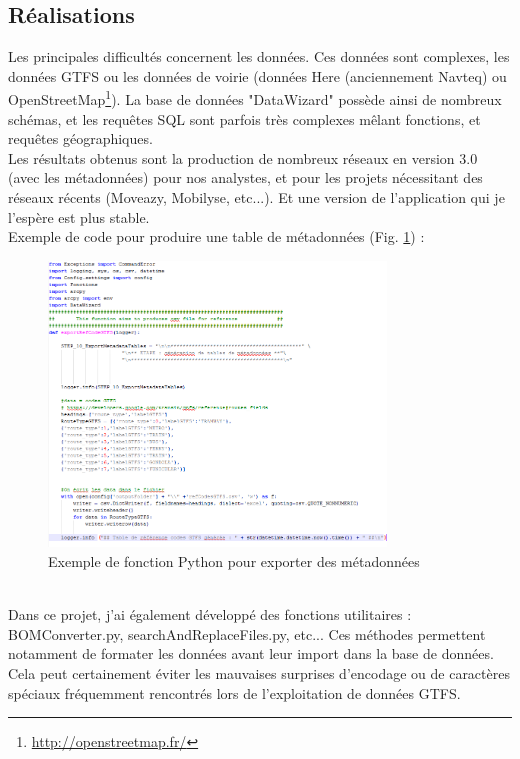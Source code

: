 \begin{itemize}
\subsection{Réalisations}

Les principales difficultés concernent les données. Ces données sont complexes, les données GTFS ou les données de voirie (données Here (anciennement Navteq) ou OpenStreetMap\footnote{\url{http://openstreetmap.fr/}}). La base de données "DataWizard" possède ainsi de nombreux schémas, et les requêtes SQL sont parfois très complexes mêlant fonctions, et requêtes géographiques.\\

Les résultats obtenus sont la production de nombreux réseaux en version 3.0 (avec les métadonnées) pour nos analystes, et pour les projets nécessitant des réseaux récents (Moveazy, Mobilyse, etc...). Et une version de l'application qui je l'espère est plus stable.\\

Exemple de code pour produire une table de métadonnées (Fig. \ref{CodeMetadata}) :
\\
\begin{figure}[h]
	\centering
		\includegraphics[width=0.8\textwidth]{images/DW_Fonction_Python.PNG}
	\caption{Exemple de fonction Python pour exporter des métadonnées}
	\label{CodeMetadata}
\end{figure}\\

Dans ce projet, j'ai également développé des fonctions utilitaires : BOMConverter.py, searchAndReplaceFiles.py, etc... Ces méthodes permettent notamment de formater les données avant leur import dans la base de données. Cela peut certainement éviter les mauvaises surprises d'encodage ou de caractères spéciaux fréquemment rencontrés lors de l'exploitation de données GTFS.\\





\end{itemize}
